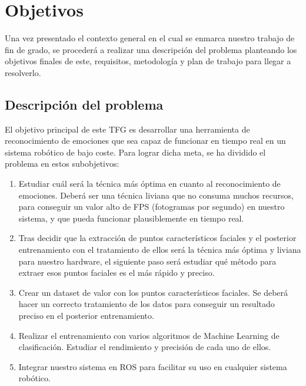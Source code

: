 \chapter{Objetivos}
\label{cap:capitulo2}

\vspace{1cm}

Una vez presentado el contexto general en el cual se enmarca nuestro trabajo de fin de grado, se procederá a realizar una descripción del problema planteando los objetivos finales de este, requisitos, metodología y plan de trabajo para llegar a resolverlo.

\section{Descripción del problema}
\label{sec:descripcion}

El objetivo principal de este TFG es desarrollar una herramienta de reconocimiento de emociones que sea capaz de funcionar en tiempo real en un sistema robótico de bajo coste. Para lograr dicha meta, se ha dividido el problema en estos subobjetivos:
\begin{enumerate}
    \item Estudiar cuál será la técnica más óptima en cuanto al reconocimiento de emociones. Deberá ser una técnica liviana que no consuma muchos recursos, para conseguir un valor alto de FPS (fotogramas por segundo) en nuestro sistema, y que pueda funcionar plausiblemente en tiempo real.
    
    \item Tras decidir que la extracción de puntos característicos faciales y el posterior entrenamiento con el tratamiento de ellos será la técnica más óptima y liviana para nuestro hardware, el siguiente paso será estudiar qué método para extraer esos puntos faciales es el más rápido y preciso.
    
    \item Crear un dataset de valor con los puntos característicos faciales. Se deberá hacer un correcto tratamiento de los datos para conseguir un resultado preciso en el posterior entrenamiento.
    
    \item Realizar el entrenamiento con varios algoritmos de Machine Learning de clasificación. Estudiar el rendimiento y precisión de cada uno de ellos.
    
    \item Integrar nuestro sistema en ROS para facilitar su uso en cualquier sistema robótico.
\end{enumerate}


